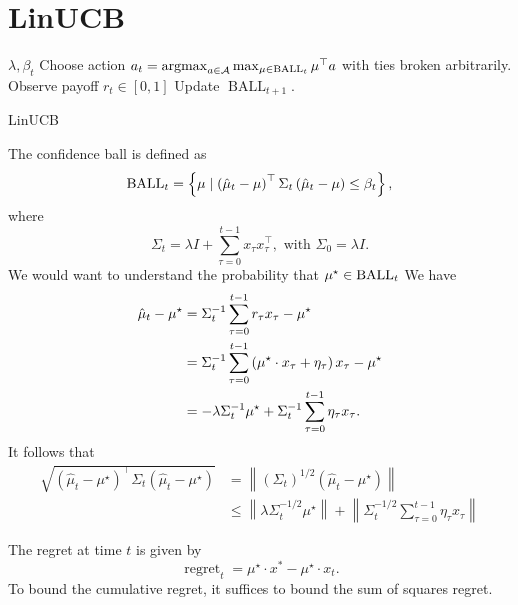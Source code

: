 \documentclass[letterpaper,11pt]{article}
\begin{document}
\section{LinUCB}

\begin{algorithm}[H]
\begin{algorithmic}[1]
\REQUIRE $\lambda, \beta_t$
\STATE Choose action $a_t=\operatorname{argmax}_{a \in \mathcal{A}} \max _{\mu \in \operatorname{BALL}_t} \mu^\top a$ with ties broken arbitrarily. 
\STATE Observe payoff $r_t \in [0, 1]$
\STATE Update $\operatorname{BALL}_{t+1}$. 
\ENDFOR
\end{algorithmic}
\caption{LinUCB}
\label{alg:seq}
\end{algorithm}

The confidence ball is defined as 
\begin{equation*}
\operatorname{BALL}_{t} = \left\{ \mu \mid \left(\hat{\mu}_t - \mu\right)^\top \Sigma_t \left(\hat{\mu}_t - \mu\right) \leq \beta_t\right\},
\end{equation*}
where 
$$
\Sigma_t=\lambda I+\sum_{\tau=0}^{t-1} x_\tau x_\tau^{\top}, \text { with } \Sigma_0=\lambda I.
$$
We would want to understand the probability that $\mu^\star \in \operatorname{BALL}_{t}$
We have
\begin{equation*}
\begin{aligned}
    \hat{\mu}_{t} - \mu^\star &= \Sigma_t^{-1} \sum_{\tau=0}^{t-1} r_\tau x_\tau - \mu^\star\\
    &= \Sigma_t^{-1} \sum_{\tau=0}^{t-1} \left(\mu^\star \cdot x_{\tau} + \eta_{\tau}\right) x_\tau - \mu^\star\\
    &= - \lambda \Sigma_t^{-1} \mu^\star + \Sigma_t^{-1} \sum_{\tau=0}^{t-1} \eta_{\tau} x_{\tau}.
\end{aligned}
\end{equation*}
It follows that 
\begin{equation*}
\begin{aligned}
\sqrt{\left(\widehat{\mu}_t-\mu^{\star}\right)^{\top} \Sigma_t\left(\widehat{\mu}_t-\mu^{\star}\right)} & =\left\|\left(\Sigma_t\right)^{1 / 2}\left(\widehat{\mu}_t-\mu^{\star}\right)\right\| \\
& \leq\left\|\lambda \Sigma_t^{-1 / 2} \mu^{\star}\right\|+\left\|\Sigma_t^{-1 / 2} \sum_{\tau=0}^{t-1} \eta_\tau x_\tau\right\|
\end{aligned}
\end{equation*}


The regret at time $t$ is given by
$$
\operatorname{regret}_t=\mu^{\star} \cdot x^*-\mu^{\star} \cdot x_t.
$$
To bound the cumulative regret, it suffices to bound the sum of squares regret. 
\end{document}
